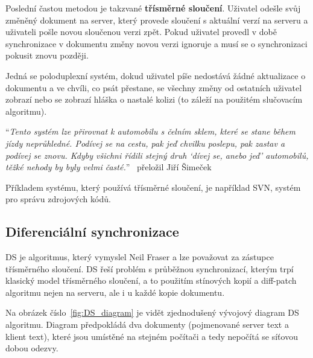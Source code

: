 Poslední častou metodou je takzvané \textbf{třísměrné sloučení}.
Uživatel odešle svůj změněný dokument na server, který provede sloučení s aktuální verzí na serveru a uživateli pošle novou sloučenou verzi zpět.
Pokud uživatel provedl v době synchronizace v dokumentu změny novou verzi ignoruje a musí se o synchronizaci pokusit znovu později.

Jedná se poloduplexní systém, dokud uživatel píše nedostává žádné aktualizace o dokumentu a ve chvíli, co psát přestane, se všechny změny od ostatních uživatel zobrazí nebo se zobrazí hláška o nastalé kolizi (to záleží na použitém slučovacím algoritmu).~\cite{ds:neil_paper}~\cite{ds:neil_video}

\enquote{\textit{Tento systém lze přirovnat k automobilu s čelním sklem, které se stane během jízdy neprůhledné.
Podívej se na cestu, pak jeď chvilku poslepu, pak zastav a podívej se znovu.
Kdyby všichni řídili stejný druh \enquote{dívej se, anebo jeď} automobilů, těžké nehody by byly velmi časté.}}~\cite{ds:neil_paper} přeložil Jiří Šimeček

Příkladem systému, který používá třísměrné sloučení, je například \gls{SVN}, systém pro správu zdrojových kódů.

\subsection{Diferenciální synchronizace}\label{subsec:diferencialniSynchronizace}

\gls{DS} je algoritmus, který vymyslel Neil Fraser a lze považovat za zástupce třísměrného sloučení.
\gls{DS} řeší problém s průběžnou synchronizací, kterým trpí klasický model třísměrného sloučení, a to použitím stínových kopií a diff-patch algoritmu nejen na serveru, ale i u každé kopie dokumentu.

Na obrázek číslo~\ref{fig:DS_diagram} je vidět zjednodušený vývojový diagram \gls{DS} algoritmu.
Diagram předpokládá dva dokumenty (pojmenované server text a klient text), které jsou umístěné na stejném počítači a tedy nepočítá se síťovou dobou odezvy.

